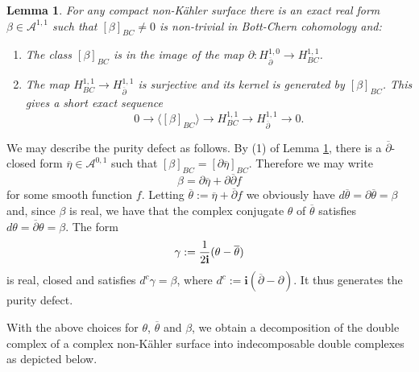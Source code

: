 \documentclass[a4paper]{amsart}
\newtheorem{lemm}[theo]{Lemma}
\theoremstyle{definition}
\newcommand{\Aa}{\mathcal{A}}
\newcommand{\ov}{\overline}
\newcommand{\del}{\partial}
\newcommand{\delb}{{\overline\partial}}
\newcommand{\lra}{\longrightarrow}
\begin{document}
\begin{lemm}\label{Verblemma}
For any  compact non-Kähler surface there is an exact real form $\beta\in \Aa^{1,1}$ such that $[\beta]_{BC}\neq 0$ is non-trivial in Bott-Chern cohomology and:
\begin{enumerate}
 \item The class $[\beta]_{BC}$ is in the image of the map $\del:H^{1,0}_\delb\lra H^{1,1}_{BC}$.
 \item The map $H^{1,1}_{BC}\to H^{1,1}_\delb$ is surjective and its kernel is generated by $[\beta]_{BC}$.
 This gives a short exact sequence 
 \[0\to \langle [\beta]_{BC}\rangle\to H^{1,1}_{BC}\to H^{1,1}_\delb\to 0.\]
\end{enumerate}
\end{lemm}

We may describe the purity defect as follows.
By (1) of Lemma \ref{Verblemma}, there is a $\delb$-closed form $\ov\eta\in \Aa^{0,1}$ such that $[\beta]_{BC}=[\del\ov\eta]_{BC}$. Therefore we may write
\[\beta=\del\ov\eta+\del\delb f\]
for some smooth function $f$. Letting $\ov\theta:=\ov\eta+\delb f$ we  obviously have $d\ov\theta=\del\ov\theta=\beta$ and, since $\beta$ is real, we have that the complex conjugate $\theta$ of $\ov\theta$ satisfies $d\theta=\delb\theta=\beta$. The form
\[\gamma:={1\over 2\mathbf{i}}(\theta-\ov\theta)\]
is real, closed and satisfies $d^c\gamma=\beta$, where $d^c:=\mathbf{i}(\delb-\del)$. It thus generates the purity defect.

 With the above choices for $\theta$, $\ov\theta$ and $\beta$, we obtain a decomposition of the double complex of a complex non-Kähler surface into indecomposable double complexes as depicted below.
 
\end{document}
